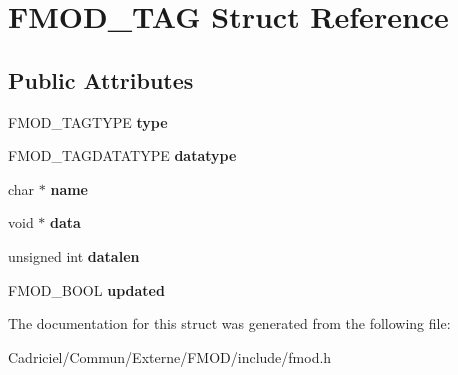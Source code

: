 \hypertarget{struct_f_m_o_d___t_a_g}{}\section{F\+M\+O\+D\+\_\+\+T\+AG Struct Reference}
\label{struct_f_m_o_d___t_a_g}
\subsection*{Public Attributes}
\begin{DoxyCompactItemize}
\item 
F\+M\+O\+D\+\_\+\+T\+A\+G\+T\+Y\+PE {\bfseries type}\hypertarget{struct_f_m_o_d___t_a_g_ad891c5f78e72ffeebc0f39e34e5b1b20}{}\label{struct_f_m_o_d___t_a_g_ad891c5f78e72ffeebc0f39e34e5b1b20}

\item 
F\+M\+O\+D\+\_\+\+T\+A\+G\+D\+A\+T\+A\+T\+Y\+PE {\bfseries datatype}\hypertarget{struct_f_m_o_d___t_a_g_acc0f4bf92ee045d5828ba7eccc3c4c23}{}\label{struct_f_m_o_d___t_a_g_acc0f4bf92ee045d5828ba7eccc3c4c23}

\item 
char $\ast$ {\bfseries name}\hypertarget{struct_f_m_o_d___t_a_g_a200d18627ec871638bb7df841a77b2ab}{}\label{struct_f_m_o_d___t_a_g_a200d18627ec871638bb7df841a77b2ab}

\item 
void $\ast$ {\bfseries data}\hypertarget{struct_f_m_o_d___t_a_g_a86247271797eb33118a5fff813c1e548}{}\label{struct_f_m_o_d___t_a_g_a86247271797eb33118a5fff813c1e548}

\item 
unsigned int {\bfseries datalen}\hypertarget{struct_f_m_o_d___t_a_g_a589281f4f1adc717798744722ec43761}{}\label{struct_f_m_o_d___t_a_g_a589281f4f1adc717798744722ec43761}

\item 
F\+M\+O\+D\+\_\+\+B\+O\+OL {\bfseries updated}\hypertarget{struct_f_m_o_d___t_a_g_a0358f4afc9957d3d3254691c3118d90a}{}\label{struct_f_m_o_d___t_a_g_a0358f4afc9957d3d3254691c3118d90a}

\end{DoxyCompactItemize}


The documentation for this struct was generated from the following file\+:\begin{DoxyCompactItemize}
\item 
Cadriciel/\+Commun/\+Externe/\+F\+M\+O\+D/include/fmod.\+h\end{DoxyCompactItemize}
